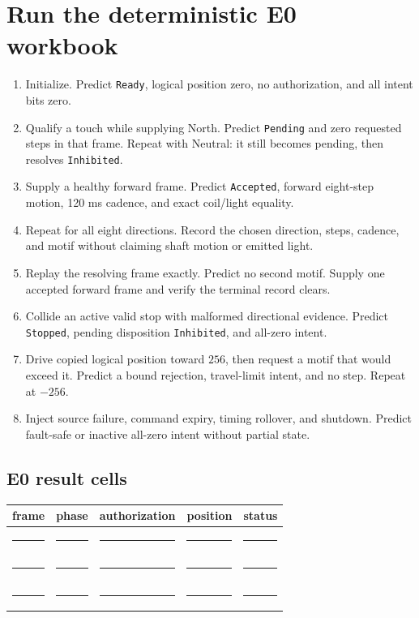 \documentclass[10pt]{article}
\newcommand{\blankline}{\rule{0.75in}{0.4pt}}
\begin{document}
\section{Run the deterministic E0 workbook}
\begin{enumerate}
 \item Initialize. Predict \texttt{Ready}, logical position zero, no
       authorization, and all intent bits zero.
 \item Qualify a touch while supplying North. Predict \texttt{Pending} and
       zero requested steps in that frame. Repeat with Neutral: it still
       becomes pending, then resolves \texttt{Inhibited}.
 \item Supply a healthy forward frame. Predict \texttt{Accepted}, forward
       eight-step motion, 120 ms cadence, and exact coil/light equality.
 \item Repeat for all eight directions. Record the chosen direction, steps,
       cadence, and motif without claiming shaft motion or emitted light.
 \item Replay the resolving frame exactly. Predict no second motif. Supply one
       accepted forward frame and verify the terminal record clears.
 \item Collide an active valid stop with malformed directional evidence.
       Predict \texttt{Stopped}, pending disposition \texttt{Inhibited}, and
       all-zero intent.
 \item Drive copied logical position toward \(256\), then request a motif that
       would exceed it. Predict a bound rejection, travel-limit intent,
       and no step. Repeat at \(-256\).
 \item Inject source failure, command expiry, timing rollover, and shutdown.
       Predict fault-safe or inactive all-zero intent without partial state.
\end{enumerate}

\subsection*{E0 result cells}
\begin{tabularx}{\linewidth}{@{}X X X X X@{}}
\toprule
frame & phase & authorization & position & status\\
\midrule
\rule{0pt}{16pt}\blankline & \blankline & \blankline & \blankline & \blankline\\[9pt]
\blankline & \blankline & \blankline & \blankline & \blankline\\[9pt]
\blankline & \blankline & \blankline & \blankline & \blankline\\
\bottomrule
\end{tabularx}
\end{document}

